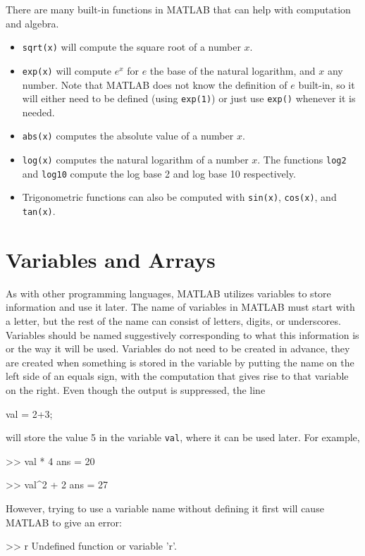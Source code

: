 There are many built-in functions in MATLAB that can help with computation and algebra. 
\begin{itemize}
    \item \texttt{sqrt(x)} will compute the square root of a number $x$.
    \item \texttt{exp(x)} will compute $e^x$ for $e$ the base of the natural logarithm, and $x$ any number. Note that MATLAB does not know the definition of $e$ built-in, so it will either need to be defined (using \texttt{exp(1)}) or just use \texttt{exp()} whenever it is needed. 
    \item \texttt{abs(x)} computes the absolute value of a number $x$.
    \item \texttt{log(x)} computes the natural logarithm of a number $x$. The functions \texttt{log2} and \texttt{log10} compute the log base 2 and log base 10 respectively.
    \item Trigonometric functions can also be computed with \texttt{sin(x)}, \texttt{cos(x)}, and \texttt{tan(x)}.
\end{itemize}

\section{Variables and Arrays}

As with other programming languages, MATLAB utilizes variables to store information and use it later. The name of variables in MATLAB must start with a letter, but the rest of the name can consist of letters, digits, or underscores. Variables should be named suggestively corresponding to what this information is or the way it will be used. Variables do not need to be created in advance, they are created when something is stored in the variable by putting the name on the left side of an equals sign, with the computation that gives rise to that variable on the right. Even though the output is suppressed, the line
\begin{matlab}
val = 2+3;
\end{matlab}
will store the value 5 in the variable \texttt{val}, where it can be used later. For example,
\begin{matlab}
>> val * 4
ans = 
    20
    
>> val^2 + 2
ans = 
    27
\end{matlab}
However, trying to use a variable name without defining it first will cause MATLAB to give an error:
\begin{matlab}
>> r
Undefined function or variable 'r'.
\end{matlab}

